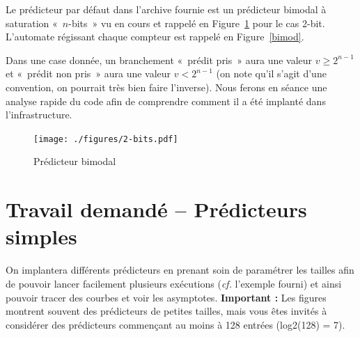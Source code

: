 \documentclass[a4paper]{article}
\begin{document}
Le prédicteur par défaut dans l'archive fournie est un prédicteur bimodal à saturation «~$n$-bits~» vu en cours et rappelé en Figure~\ref{2-bit} pour le cas 2-bit. L'automate régissant chaque compteur est rappelé en Figure~\ref{bimod}.

Dans une case donnée, un branchement «~prédit pris~» aura une valeur $v\geq 2^{n-1}$ et «~prédit non pris~» aura une valeur $v<2^{n-1}$ (on note qu'il s'agit d'une convention, on pourrait très bien faire l'inverse). Nous ferons en séance une analyse rapide du code afin de comprendre comment il a été implanté dans l'infrastructure.

\begin{figure}[htb]
      \center\texttt{[image: ./figures/2-bits.pdf]}
      \caption{Prédicteur bimodal}
      \label{2-bit}
\end{figure}

\section{Travail demandé -- Prédicteurs simples}
On implantera différents prédicteurs en prenant soin de paramétrer les tailles afin de pouvoir lancer facilement plusieurs exécutions (\emph{cf.} l'exemple fourni) et ainsi pouvoir tracer des courbes et voir les asymptotes. \textbf{Important :} Les figures montrent souvent des prédicteurs de petites tailles, mais vous êtes invités à considérer des prédicteurs commençant au moins à 128 entrées (log2(128) = 7).
\end{document}
